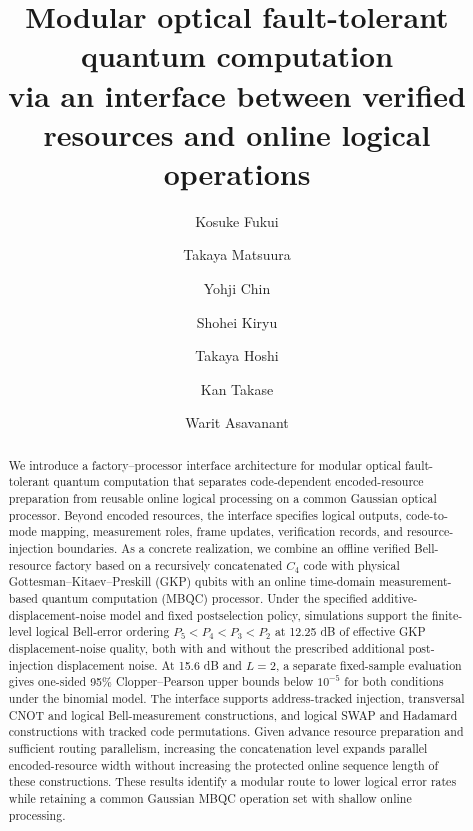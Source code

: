 \documentclass[aps,
prx,
superscriptaddress,
reprint,
longbibliography,
floatfix]{revtex4-2}
\begin{document}
\raggedbottom

\title{Modular optical fault-tolerant quantum computation\\via an interface between verified resources and online logical operations}

\author{Kosuke Fukui}
\author{Takaya Matsuura}
\author{Yohji Chin}
\author{Shohei Kiryu}
\author{Takaya Hoshi}
\author{Kan Takase}
\author{Warit Asavanant}

\begin{abstract}
We introduce a factory--processor interface architecture for modular optical fault-tolerant quantum computation that separates code-dependent encoded-resource preparation from reusable online logical processing on a common Gaussian optical processor. Beyond encoded resources, the interface specifies logical outputs, code-to-mode mapping, measurement roles, frame updates, verification records, and resource-injection boundaries. As a concrete realization, we combine an offline verified Bell-resource factory based on a recursively concatenated $C_4$ code with physical Gottesman--Kitaev--Preskill (GKP) qubits with an online time-domain measurement-based quantum computation (MBQC) processor. Under the specified additive-displacement-noise model and fixed postselection policy, simulations support the finite-level logical Bell-error ordering $P_5<P_4<P_3<P_2$ at 12.25 dB of effective GKP displacement-noise quality, both with and without the prescribed additional post-injection displacement noise. At 15.6 dB and $L=2$, a separate fixed-sample evaluation gives one-sided 95$\%$ Clopper--Pearson upper bounds below $10^{-5}$ for both conditions under the binomial model. The interface supports address-tracked injection, transversal CNOT and logical Bell-measurement constructions, and logical SWAP and Hadamard constructions with tracked code permutations. Given advance resource preparation and sufficient routing parallelism, increasing the concatenation level expands parallel encoded-resource width without increasing the protected online sequence length of these constructions. These results identify a modular route to lower logical error rates while retaining a common Gaussian MBQC operation set with shallow online processing.
\end{abstract}

\maketitle
\end{document}
